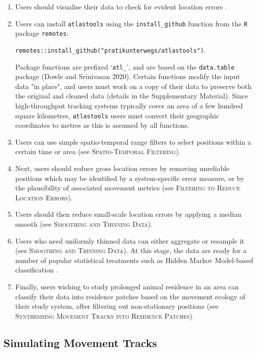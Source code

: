 \documentclass[10pt,paper=a4,headings=standardclasses
]{scrartcl}
\begin{document}
\begin{enumerate}
    
    \item Users should visualise their data to check for evident location errors \citep{slingsby2016}.
    \item Users can install \texttt{atlastools} using the \texttt{install\_github} function from the \texttt{R} package \texttt{remotes}:
    
    \texttt{remotes::install\_github("pratikunterwegs/atlastools")}.
    
    Package functions are prefixed `\texttt{atl\_}', and are based on the \texttt{data.table} package (Dowle and Srinivasan 2020).
    Certain functions modify the input data "in place", and users must work on a copy of their data to preserve both the original and cleaned data (details in the Supplementary Material).
    Since high-throughput tracking systems typically cover an area of a few hundred square kilometres, \texttt{atlastools} users must convert their geographic coordinates to metres as this is assumed by all functions.
    \item Users can use simple spatio-temporal range filters to select positions within a certain time or area (see \textsc{Spatio-Temporal Filtering}).
    \item Next, users should reduce gross location errors by removing unreliable positions which may be identified by a system-specific error measure, or by the plausibility of associated movement metrics (see \textsc{Filtering to Reduce Location Errors}).
    \item Users should then reduce small-scale location errors by applying a median smooth (see \textsc{Smoothing and Thinning Data}).
    \item Users who need uniformly thinned data can either aggregate or resample it (see \textsc{Smoothing and Thinning Data}).
    At this stage, the data are ready for a number of popular statistical treatments such as Hidden Markov Model-based classification \citep{michelot2016,langrock2012}.
    \item Finally, users wishing to study prolonged animal residence in an area can classify their data into residence patches based on the movement ecology of their study system, after filtering out non-stationary positions (see \textsc{Synthesising Movement Tracks into Residence Patches}).
    
\end{enumerate}

\subsection{Simulating Movement Tracks}
\end{document}
